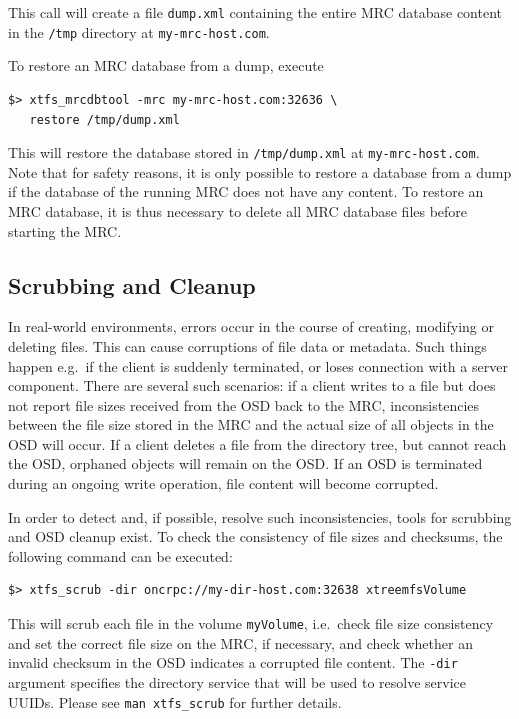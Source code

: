 \documentclass[a4paper,10pt]{book}
\begin{document}
This call will create a file \texttt{dump.xml} containing the entire MRC database content in the \texttt{/tmp} directory at \texttt{my-mrc-host.com}.

To restore an MRC database from a dump, execute

\begin{verbatim}
$> xtfs_mrcdbtool -mrc my-mrc-host.com:32636 \
   restore /tmp/dump.xml
\end{verbatim}

This will restore the database stored in \texttt{/tmp/dump.xml} at \texttt{my-mrc-host.com}. Note that for safety reasons, it is only possible to restore a database from a dump if the database of the running MRC does not have any content. To restore an MRC database, it is thus necessary to delete all MRC database files before starting the MRC.

\subsection{Scrubbing and Cleanup}

In real-world environments, errors occur in the course of creating, modifying or deleting files. This can cause corruptions of file data or metadata. Such things happen e.g.\ if the client is suddenly terminated, or loses connection with a server component. There are several such scenarios: if a client writes to a file but does not report file sizes received from the OSD back to the MRC, inconsistencies between the file size stored in the MRC and the actual size of all objects in the OSD will occur. If a client deletes a file from the directory tree, but cannot reach the OSD, orphaned objects will remain on the OSD. If an OSD is terminated during an ongoing write operation, file content will become corrupted.

In order to detect and, if possible, resolve such inconsistencies, tools for scrubbing and OSD cleanup exist. To check the consistency of file sizes and checksums, the following command can be executed:

\begin{verbatim}
$> xtfs_scrub -dir oncrpc://my-dir-host.com:32638 xtreemfsVolume
\end{verbatim}

This will scrub each file in the volume \texttt{myVolume}, i.e.\ check file size consistency and set the correct file size on the MRC, if necessary, and check whether an invalid checksum in the OSD indicates a corrupted file content. The \texttt{-dir} argument specifies the directory service that will be used to resolve service UUIDs. Please see \texttt{man xtfs\_scrub} for further details.
\end{document}
